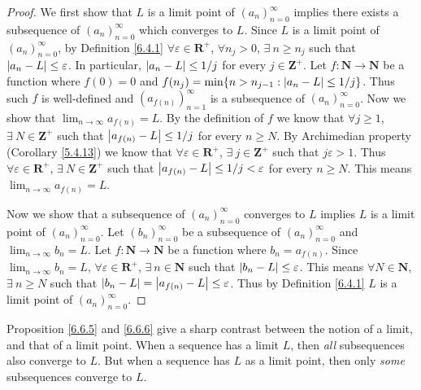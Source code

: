 \begin{proof}
    We first show that \(L\) is a limit point of \((a_n)_{n = 0}^\infty\) implies there exists a subsequence of \((a_n)_{n = 0}^\infty\) which converges to \(L\).
    Since \(L\) is a limit point of \((a_n)_{n = 0}^\infty\), by Definition \ref{6.4.1} \(\forall \varepsilon \in \mathbf{R}^+\), \(\forall n_j > 0\), \(\exists\ n \geq n_j\) such that \(\abs*{a_n - L} \leq \varepsilon\).
    In particular, \(\abs*{a_n - L} \leq 1 / j\) for every \(j \in \mathbf{Z}^+\).
    Let \(f : \mathbf{N} \to \mathbf{N}\) be a function where \(f(0) = 0\) and \(f(n_j) = \min\{n > n_{j - 1} : \abs*{a_n - L} \leq 1 / j\}\).
    Thus such \(f\) is well-defined and \((a_{f(n)})_{n = 1}^\infty\) is a subsequence of \((a_n)_{n = 0}^\infty\).
    Now we show that \(\lim_{n \to \infty} a_{f(n)} = L\).
    By the definition of \(f\) we know that \(\forall j \geq 1\), \(\exists\ N \in \mathbf{Z}^+\) such that \(\abs*{a_{f(n)} - L} \leq 1 / j\) for every \(n \geq N\).
    By Archimedian property (Corollary \ref{5.4.13}) we know that \(\forall \varepsilon \in \mathbf{R}^+\), \(\exists\ j \in \mathbf{Z}^+\) such that \(j \varepsilon > 1\).
    Thus \(\forall \varepsilon \in \mathbf{R}^+\), \(\exists\ N \in \mathbf{Z}^+\) such that \(\abs*{a_{f(n)} - L} \leq 1 / j < \varepsilon\) for every \(n \geq N\).
    This means \(\lim_{n \to \infty} a_{f(n)} = L\).

    Now we show that a subsequence of \((a_n)_{n = 0}^\infty\) converges to \(L\) implies \(L\) is a limit point of \((a_n)_{n = 0}^\infty\).
    Let \((b_n)_{n = 0}^\infty\) be a subsequence of \((a_n)_{n = 0}^\infty\) and \(\lim_{n \to \infty} b_n = L\).
    Let \(f : \mathbf{N} \to \mathbf{N}\) be a function where \(b_n = a_{f(n)}\).
    Since \(\lim_{n \to \infty} b_n = L\), \(\forall \varepsilon \in \mathbf{R}^+\), \(\exists\ n \in \mathbf{N}\) such that \(\abs*{b_n - L} \leq \varepsilon\).
    This means \(\forall N \in \mathbf{N}\), \(\exists\ n \geq N\) such that \(\abs*{b_n - L} = \abs*{a_{f(n)} - L} \leq \varepsilon\).
    Thus by Definition \ref{6.4.1} \(L\) is a limit point of \((a_n)_{n = 0}^\infty\).
\end{proof}

\begin{remark}\label{6.6.7}
    Proposition \ref{6.6.5} and \ref{6.6.6} give a sharp contrast between the notion of a limit, and that of a limit point.
    When a sequence has a limit \(L\), then \emph{all} subsequences also converge to \(L\).
    But when a sequence has \(L\) as a limit point, then only \emph{some} subsequences converge to \(L\).
\end{remark}

